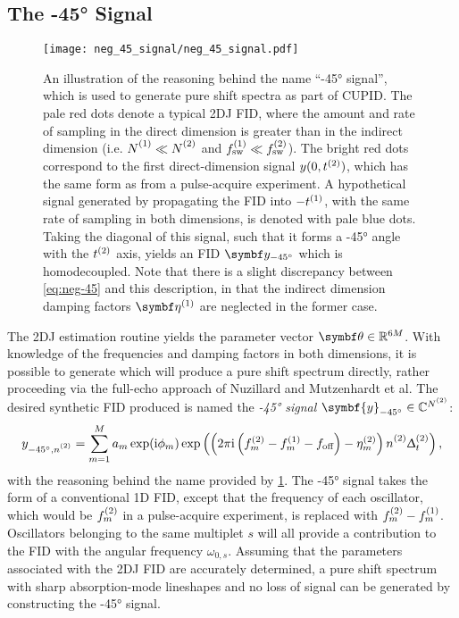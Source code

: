 \subsection{The \ang{-45} Signal}
\begin{figure}
    \centering
    \texttt{[image: neg\_45\_signal/neg\_45\_signal.pdf]}
    \caption[
        An illustration of the reasoning behind the name ``\ang{-45}
        signal'', which is used to generate pure shift spectra as part of
        \acs{CUPID}.
    ]{
        An illustration of the reasoning behind the name ``\ang{-45}
        signal'', which is used to generate pure shift spectra as part of
        \ac{CUPID}. The pale red
        dots denote
        a typical \ac{2DJ} \ac{FID}, where
        the amount and rate of sampling in the direct dimension is greater than
        in the indirect dimension (i.e. $\None \ll \Ntwo$ and $f_{\mathrm{sw}}^{(1)} \ll
        f_{\mathrm{sw}}^{(2)}$). The bright red dots correspond to the first direct-dimension
        signal $y(0,t^{(2)})$, which has the same form as
         from a pulse-acquire experiment. A hypothetical signal
        generated by propagating the \ac{FID} into $-t^{(1)}$, with the same rate
        of sampling in both dimensions, is denoted with pale blue dots. Taking
        the diagonal of this signal, such that it forms a \ang{-45} angle with the
        $t^{(2)}$ axis, yields an \ac{FID} $\by_{\ang{-45}}$  which is
        homodecoupled. Note that there is a slight discrepancy
        between \cref{eq:neg-45} and this description, in that the
        indirect dimension damping factors $\bdetaone$ are neglected in the
        former case.
    }
    \label{fig:neg-45}
\end{figure}
The \ac{2DJ} estimation routine yields the parameter vector $\bth \in
\mathbb{R}^{6M}$. With
knowledge of the frequencies and damping factors in both dimensions, it is
possible to generate  which will produce a pure shift spectrum
directly, rather proceeding via the full-echo approach of Nuzillard and
Mutzenhardt et al.
The desired synthetic \ac{FID} produced is named the \emph{\ang{-45} signal}
$\symbf{y}_{\ang{-45}} \in \mathbb{C}^{\Ntwo}$:
\begin{equation}
    y_{\ang{-45},\ntwo} =
        \sum_{m=1}^{M} a_m \exp (\iu \phi_m)
        \exp\left(\left(2 \pi \iu \left(\ftwo_m - \fone_m - \foff\right)
                - \etatwo_m
            \right) \ntwo \Dttwo
        \right),
    \label{eq:neg-45}
\end{equation}
with the reasoning behind the name provided by \cref{fig:neg-45}.
The \ang{-45} signal
takes the form of a conventional \ac{1D} \ac{FID},
except that the frequency of each oscillator, which would be $f^{(2)}_m$ in a
pulse-acquire experiment,
is replaced with $f^{(2)}_m - f^{(1)}_m$. Oscillators belonging to the same
multiplet $s$ will all provide a contribution to the \ac{FID} with the
angular frequency $\omega_{0,s}$.
Assuming that the parameters associated with the \ac{2DJ}
\ac{FID} are accurately determined, a pure shift spectrum with sharp
absorption-mode lineshapes and no loss of signal can be generated by
constructing the \ang{-45} signal.


